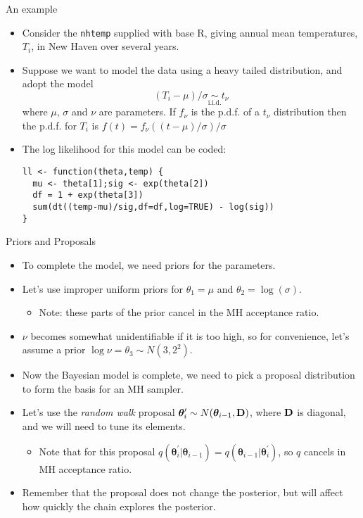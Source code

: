 \documentclass{beamer}
\begin{document}
\begin{frame}[fragile]{An example}
\begin{itemize}
\item Consider the {\tt nhtemp} supplied with base R, giving annual mean temperatures, $T_i$, in New Haven over several years.
\item Suppose we want to model the data using a heavy tailed distribution, and adopt the model
$$
(T_i - \mu)/\sigma \underset{\text{i.i.d.}}{\sim} t_\nu
$$
where $\mu$, $\sigma$ and $\nu$ are parameters. If $f_\nu$ is the p.d.f. of a $t_\nu$ distribution then the p.d.f. for $T_i$ is
$
f(t) = f_\nu((t-\mu)/\sigma) /\sigma
$
\item The log likelihood for this model can be coded:
{\small \begin{verbatim}
ll <- function(theta,temp) { 
  mu <- theta[1];sig <- exp(theta[2]) 
  df = 1 + exp(theta[3])
  sum(dt((temp-mu)/sig,df=df,log=TRUE) - log(sig)) 
}
\end{verbatim}}
\end{itemize}
\end{frame}


\begin{frame}{Priors and Proposals}
\begin{itemize}
\item To complete the model, we need priors for the parameters. 
\item Let's use improper uniform priors for $\theta_1 = \mu$ and $\theta_2=\log(\sigma)$.
\begin{itemize}
\item Note: these parts of the prior cancel in the MH acceptance ratio.
\end{itemize}
\item $\nu$ becomes somewhat unidentifiable if it is too high, so for convenience, let's assume a prior
$\log \nu = \theta_3 \sim N(3,2^2)$.
\item Now the Bayesian model is complete, we need to pick a proposal distribution to form the basis for an MH sampler. 
\item Let's use the {\em random walk} proposal ${\bm \theta}_i^\prime \sim N({\bm \theta}_{i-1},{\bf D})$, where $\bf D$ is diagonal, and we will need to tune its elements. 
\begin{itemize}
\item Note that for this proposal $q({\bm \theta}_i^\prime|{\bm \theta}_{i-1}) = q({\bm \theta}_{i-1}|{\bm \theta}^\prime_i)$, so $q$ cancels in MH acceptance ratio.
\end{itemize}
\item Remember that the proposal does not change the posterior, but will affect how quickly the chain explores the posterior. 
\end{itemize}
\end{frame}
\end{document}
